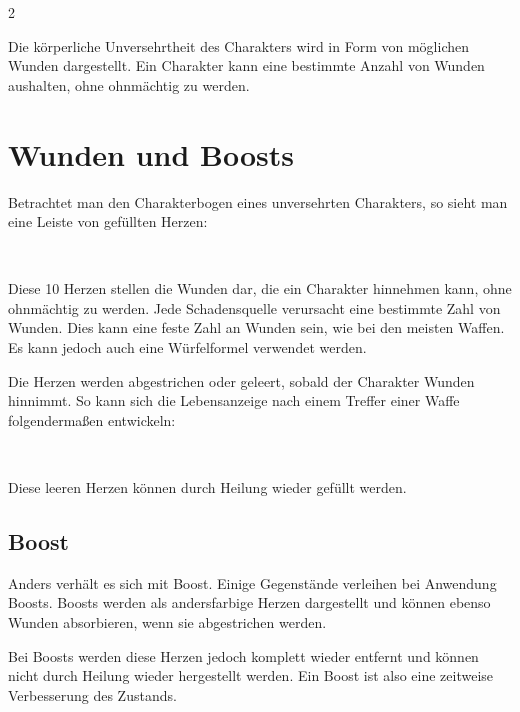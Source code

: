 \label{ch:wounds}

\begin{multicols}{2}

Die körperliche Unversehrtheit des Charakters wird in Form von möglichen Wunden dargestellt. Ein Charakter kann eine bestimmte Anzahl von Wunden aushalten, ohne ohnmächtig zu werden.

\section{Wunden und Boosts}

Betrachtet man den Charakterbogen eines unversehrten Charakters, so sieht man eine Leiste von gefüllten Herzen:

\textcolor{red}{\large{}~~~~~~~~~}

Diese 10 Herzen stellen die Wunden dar, die ein Charakter hinnehmen kann, ohne ohnmächtig zu werden. Jede Schadensquelle verursacht eine bestimmte Zahl von Wunden. Dies kann eine feste Zahl an Wunden sein, wie bei den meisten Waffen. Es kann jedoch auch eine Würfelformel verwendet werden.

Die Herzen werden abgestrichen oder geleert, sobald der Charakter Wunden hinnimmt. So kann sich die Lebensanzeige nach einem Treffer einer Waffe folgendermaßen entwickeln:

\textcolor{red}{\large{}~~~~~~~~~}

Diese leeren Herzen können durch Heilung wieder gefüllt werden.

\subsection{Boost}

Anders verhält es sich mit Boost. Einige Gegenstände verleihen bei Anwendung Boosts. Boosts werden als andersfarbige Herzen dargestellt und können ebenso Wunden absorbieren, wenn sie abgestrichen werden.

Bei Boosts werden diese Herzen jedoch komplett wieder entfernt und können nicht durch Heilung wieder hergestellt werden. Ein Boost ist also eine zeitweise Verbesserung des Zustands.


\end{multicols}
